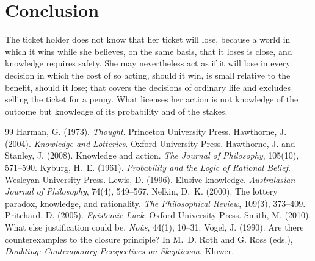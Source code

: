 \documentclass{situationist-preprint}
\begin{document}
\section{Conclusion}

The ticket holder does not know that her ticket will lose, because a world in which it wins while she believes, on the same basis, that it loses is close, and knowledge requires safety. She may nevertheless act as if it will lose in every decision in which the cost of so acting, should it win, is small relative to the benefit, should it lose; that covers the decisions of ordinary life and excludes selling the ticket for a penny. What licenses her action is not knowledge of the outcome but knowledge of its probability and of the stakes.

\begin{thebibliography}{99}\small
{} Harman, G. (1973). \emph{Thought}. Princeton University Press.
 Hawthorne, J. (2004). \emph{Knowledge and Lotteries}. Oxford University Press.
 Hawthorne, J. and Stanley, J. (2008). Knowledge and action. \emph{The Journal of Philosophy}, 105(10), 571--590.
 Kyburg, H.~E. (1961). \emph{Probability and the Logic of Rational Belief}. Wesleyan University Press.
 Lewis, D. (1996). Elusive knowledge. \emph{Australasian Journal of Philosophy}, 74(4), 549--567.
 Nelkin, D.~K. (2000). The lottery paradox, knowledge, and rationality. \emph{The Philosophical Review}, 109(3), 373--409.
 Pritchard, D. (2005). \emph{Epistemic Luck}. Oxford University Press.
 Smith, M. (2010). What else justification could be. \emph{No\^us}, 44(1), 10--31.
 Vogel, J. (1990). Are there counterexamples to the closure principle? In M.~D. Roth and G. Ross (eds.), \emph{Doubting: Contemporary Perspectives on Skepticism}. Kluwer.
\end{thebibliography}
\end{document}
